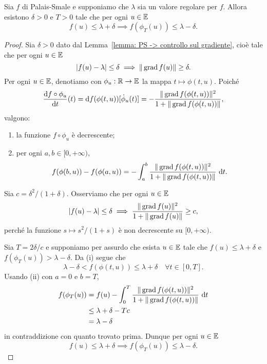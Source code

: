 	\begin{lemma}\label{lemma: di deformazione}
		Sia \(f\) di Palais-Smale e supponiamo che \(\lambda\) sia un valore regolare per \(f\). Allora esistono \(\delta>0\) e \(T>0\) tale che per ogni \(u \in \mathbb{E}\)
		\[
		f(u)\leq \lambda +\delta \implies f(\phi_T(u)) \leq \lambda -\delta.
		\]
	\end{lemma}
	\begin{proof}
		Sia \(\delta>0\) dato dal Lemma~\ref{lemma: PS -> controllo sul gradiente}, cioè tale che per ogni \(u \in \mathbb{E}\)
		\[
		|f(u)-\lambda| \leq \delta \implies \|\operatorname{grad} f(u)\| \geq \delta.
		\]
		Per ogni \(u \in \mathbb{E}\), denotiamo con \(\phi_u: \mathbb{R} \to \mathbb{E}\) la mappa \( t \mapsto \phi(t,u) \).
		Poiché
		\[
		\frac{\mathrm{d} f \circ \phi_u}{\mathrm{d} t}(t) = \mathrm{d} f (\phi(t,u))[\dot \phi_u(t)] = - \frac{\|\operatorname{grad} f(\phi(t,u))\|^2}{1+\|\operatorname{grad} f(\phi(t,u))\|},
		\]
		valgono:
		\begin{enumerate}[label=(\roman*)]
			\item la funzione \(f \circ \phi_u\) è decrescente;
			\item per ogni \(a,b \in [0,+\infty)\),
			\[
			f(\phi(b,u))-f(\phi(a,u)) = -\int_a^b \frac{\|\operatorname{grad} f(\phi(t,u))\|^2}{1+\|\operatorname{grad} f(\phi(t,u))\|} \ \mathrm{d} t.
			\]
		\end{enumerate}
		
		Sia \(c=\delta^2/(1+\delta)\). Osserviamo che per ogni \(u \in \mathbb{E}\)
		\[
		|f(u)-\lambda| \leq \delta \implies \frac{\|\operatorname{grad} f(u)\|^2}{1+\|\operatorname{grad} f(u)\|} \geq c,
		\]
		perché la funzione \(s \mapsto s^2/(1+s)\) è non decrescente su \([0,+\infty)\).
		
		
		Sia \(T= 2\delta/c\) e supponiamo per assurdo che esista \(u \in \mathbb{E}\) tale che \(f(u)\leq \lambda +\delta\) e \(f(\phi_T(u)) > \lambda -\delta\). Da (i) segue che
		\[
		\lambda-\delta < f(\phi(t,u)) \leq \lambda+\delta \quad \forall t \in [0,T].
		\]
		Usando (ii) con \(a=0\) e \(b=T\),
		\begin{align*}
			f(\phi_T(u)) &= f(u) - \int_0^T \frac{\|\operatorname{grad} f(\phi(t,u))\|^2}{1+\|\operatorname{grad} f(\phi(t,u))\|} \ \mathrm{d} t \\
			& \leq \lambda +\delta - T c \\
			&= \lambda -\delta 
		\end{align*}
		in contraddizione con quanto trovato prima. Dunque per ogni \(u \in \mathbb{E}\)
		\[
		f(u)\leq \lambda +\delta \implies f(\phi_T(u)) \leq \lambda -\delta.
		\]
		
	\end{proof}
	
